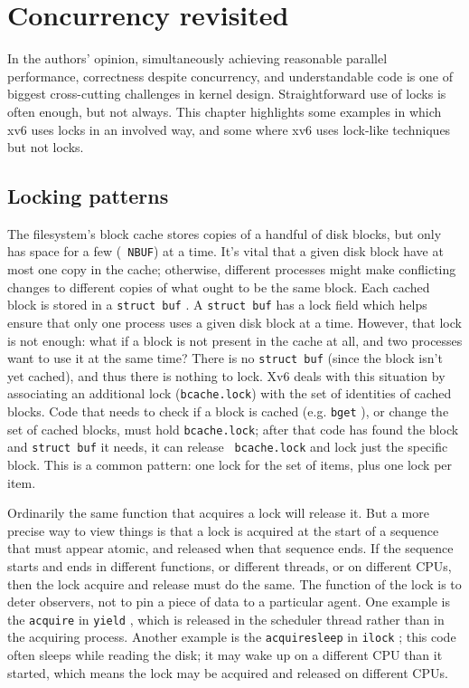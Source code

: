 \chapter{Concurrency revisited}
\label{CH:LOCK2}

In the authors' opinion, simultaneously achieving reasonable parallel
performance, correctness despite concurrency, and understandable code
is one of biggest cross-cutting challenges in kernel design.
Straightforward use of locks is often enough, but not always. This
chapter highlights some examples in which xv6 uses locks in an
involved way, and some where xv6 uses lock-like techniques but not
locks.

\section{Locking patterns}

The filesystem's block cache  stores
copies of a handful of disk blocks, but only has space for a few ({\tt
  NBUF}) at a time. It's vital that a given disk block have at most
one copy in the cache; otherwise, different processes might make
conflicting changes to different copies of what ought to be the same
block. Each cached block is stored in a {\tt struct buf}
. A {\tt struct buf} has a lock field which
helps ensure that only one process uses a given disk block at a time.
However, that lock is not enough: what if a block is not present in
the cache at all, and two processes want to use it at the same time?
There is no {\tt struct buf} (since the block isn't yet cached), and
thus there is nothing to lock. Xv6 deals with this situation by
associating an additional lock ({\tt bcache.lock}) with the set of
identities of cached blocks. Code that needs to check if a block is
cached (e.g. {\tt bget} ), or change the
set of cached blocks, must hold {\tt bcache.lock}; after that code has
found the block and {\tt struct buf} it needs, it can release {\tt
  bcache.lock} and lock just the specific block. This is a common
pattern: one lock for the set of items, plus one lock per item.

Ordinarily the same function that acquires a lock will release it. But
a more precise way to view things is that a lock is acquired at the
start of a sequence that must appear atomic, and released when that
sequence ends. If the sequence starts and ends in different functions,
or different threads, or on different CPUs, then the lock acquire and
release must do the same. The function of the lock is to deter
observers, not to pin a piece of data to a particular agent. One
example is the {\tt acquire} in {\tt yield}
, which is released in the scheduler
thread rather than in the acquiring process. Another example is the
{\tt acquiresleep} in {\tt ilock} ; this
code often sleeps while reading the disk; it may wake up on a
different CPU than it started, which means the lock may be acquired
and released on different CPUs.

